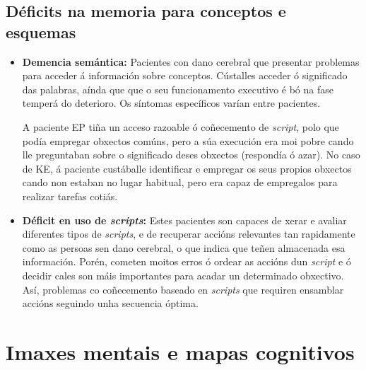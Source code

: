 \documentclass[a4paper,11pt]{article}
\begin{document}
\subsection{Déficits na memoria para conceptos e esquemas}
\begin{itemize}
	\item \textbf{Demencia semántica:} Pacientes con dano cerebral que presentar problemas para 
	acceder á información sobre conceptos. Cústalles acceder ó significado das palabras, aínda que 
	que o seu funcionamento executivo é bó na fase temperá do deterioro. Os síntomas específicos 
	varían entre pacientes.
	
	A paciente EP tiña un acceso razoable ó coñecemento de \textit{script}, polo que podía empregar 
	obxectos comúns, pero a súa execución era moi pobre cando lle preguntaban sobre o significado 
	deses obxectos (respondía ó azar). No caso de KE, á paciente custáballe identificar e empregar 
	os seus propios obxectos cando non estaban no lugar habitual, pero era capaz de empregalos para 
	realizar tarefas cotiás. 
	\item \textbf{Déficit en uso de \textit{scripts}:} Estes pacientes son capaces de xerar e 
	avaliar diferentes tipos de \textit{scripts}, e de recuperar accións relevantes tan rapidamente 
	como as persoas sen dano cerebral, o que indica que teñen almacenada esa información. Porén, 
	cometen moitos erros ó ordear as accións dun \textit{script} e ó decidir cales son máis 
	importantes para acadar un determinado obxectivo. Así, problemas co coñecemento baseado en 
	\textit{scripts} que requiren ensamblar accións seguindo unha secuencia óptima.
\end{itemize}

\section{Imaxes mentais e mapas cognitivos}
\end{document}

